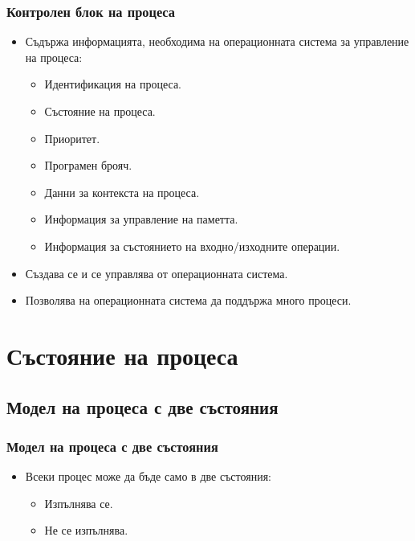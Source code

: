 \documentclass[ignorenonframetext, hyperref=unicode]{beamer}
\begin{document}
\begin{frame}\frametitle{Контролен блок на процеса}
\begin{itemize}
\item Съдържа информацията, необходима на операционната система за управление на
процеса:
\begin{itemize}
  \item Идентификация на процеса.
  \item Състояние на процеса.
  \item Приоритет.
  \item Програмен брояч.
  \item Данни за контекста на процеса.
  \item Информация за управление на паметта.
  \item Информация за състоянието на входно/изходните операции.
\end{itemize}
\item Създава се и се управлява от операционната система.
\item Позволява на операционната система да поддържа много процеси.
\end{itemize}
\end{frame}


\section{Състояние на процеса}

\subsection{Модел на процеса с две състояния}

\begin{frame}\frametitle{Модел на процеса с две състояния}
\begin{itemize}
\item Всеки процес може да бъде само в две състояния:
\begin{itemize}
  \item Изпълнява се.
  \item Не се изпълнява.
\end{itemize}
\end{itemize}
\begin{figure}[h]
\center
{}
\end{figure}
\end{frame}
\end{document}
